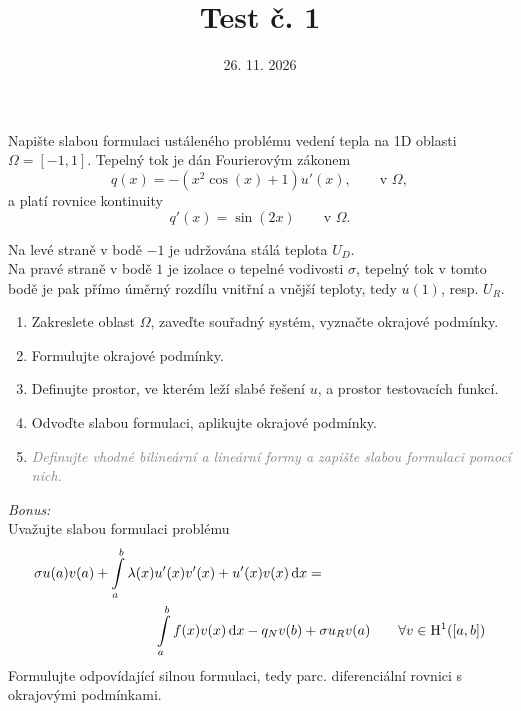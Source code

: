 \documentclass{article}
\def\d{{\rm{d}}}
\begin{document}
\title{Test č. 1}
\date{26. 11. 2026}
\author{}
\maketitle


\noindent

Napište slabou formulaci ustáleného problému vedení tepla na 1D oblasti $\Omega=[-1,1]$.
Tepelný tok je dán Fourierovým zákonem
\[
    q(x) = -\left(x^2\cos(x)+1\right)u'(x), \qquad \textrm{v }\Omega,
\]
a platí rovnice kontinuity
\[
    q'(x) = \sin(2x) \qquad \textrm{v }\Omega.
\]

\noindent
Na levé straně v bodě $-1$ je udržována stálá teplota $U_D$.\\
Na pravé straně v bodě $1$ je izolace o tepelné vodivosti $\sigma$, tepelný tok v tomto bodě je pak přímo úměrný rozdílu vnitřní
a vnější teploty, tedy $u(1)$, resp. $U_R$.

\begin{enumerate}
\item Zakreslete oblast $\Omega$, zaveďte souřadný systém, vyznačte okrajové podmínky.
\item Formulujte okrajové podmínky.
\item Definujte prostor, ve kterém leží slabé řešení $u$, a prostor testovacích funkcí.
\item Odvoďte slabou formulaci, aplikujte okrajové podmínky.
\item \textit{\textcolor{gray}{Definujte vhodné bilineární a lineární formy a zapište slabou formulaci pomocí nich.}}
\end{enumerate}


\vspace{1.5cm}
\emph{Bonus:}\\
Uvažujte slabou formulaci problému
\begin{align*}
    \sigma u(a)v(a) + \int\limits_{a}^{b} \lambda(x) & u'(x)v'(x) + u'(x)v(x) \,\d x = \\
        &\int\limits_{a}^{b} f(x)v(x) \,\d x - q_Nv(b) + \sigma u_R v(a) \qquad \forall v\in \mathrm{H}^1([a,b])
\end{align*}
Formulujte odpovídající silnou formulaci, tedy parc. diferenciální rovnici s okrajovými podmínkami.
\end{document}
